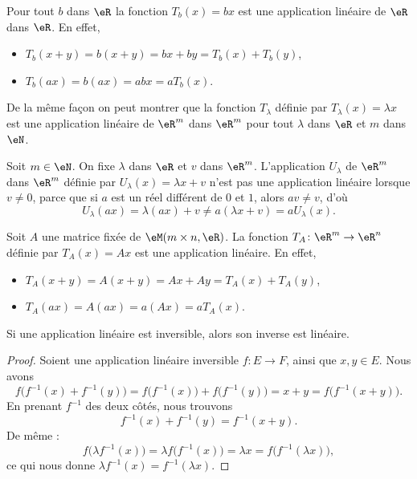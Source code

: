 \begin{example}     \label{EXooMAWMooEaNWpl}
	Pour tout \( b\) dans \( \eR\) la fonction \( T_b(x)= bx\) est une application linéaire de \( \eR\) dans \( \eR\). En effet,
	\begin{itemize}
		\item  \( T_b(x+y)= b(x+y)= bx + by = T_b(x)+T_b(y)\),
		\item \( T_b(ax)=b(ax)= abx = a T_b(x)\).
	\end{itemize}
	De la même façon on peut montrer que la fonction \( T_{\lambda}\) définie par \( T_{\lambda}(x)=\lambda x\) est une application linéaire de \( \eR^m\) dans \( \eR^m\) pour tout \( \lambda\) dans \( \eR\) et \( m\) dans \( \eN\).
\end{example}

\begin{example}     \label{ex_affine}
	Soit \( m\in\eN\). On fixe \( \lambda\) dans \( \eR\) et \( v\) dans \( \eR^m\). L'application \( U_{\lambda}\) de \( \eR^m\) dans \( \eR^m\) définie par \( U_{\lambda}(x)=\lambda x+v\) n'est pas une application linéaire lorsque \( v \neq 0 \), parce que si \( a \) est un réel différent de \(0 \) et \( 1 \), alors \( av \neq v \), d'où
	\[
		U_{\lambda}(ax)=\lambda(ax)+v\neq a(\lambda x+v) =a U_{\lambda}(x).
	\]
\end{example}

\begin{example}     \label{exampleT_A}
	Soit \( A\) une matrice fixée de \( \eM(m\times n, \eR)\). La fonction \( T_A\colon \eR^m\to \eR^n\) définie par \( T_A(x)=Ax\) est une application linéaire. En effet,
	\begin{itemize}
		\item \( T_A(x+y) = A(x+y)= Ax + Ay = T_A(x)+T_A(y)\),
		\item \( T_A(ax)  = A(ax) = a(Ax)   = a T_A(x)\).
	\end{itemize}
\end{example}

\begin{lemma}       \label{LEMooLGEHooVEEoiU}
	Si une application linéaire est inversible, alors son inverse est linéaire.
\end{lemma}

\begin{proof}
	Soient une application linéaire inversible \( f\colon E\to F\), ainsi que \( x,y\in E\). Nous avons
	\begin{equation}
		f\big( f^{-1}(x)+f^{-1}(y) \big)=f\big( f^{-1}(x) \big)+f\big( f^{-1}(y) \big)=x+y=f\big( f^{-1}(x+y) \big).
	\end{equation}
	En prenant \( f^{-1}\) des deux côtés, nous trouvons
	\begin{equation}
		f^{-1}(x)+f^{-1}(y)=f^{-1}(x+y).
	\end{equation}
	De même :
	\begin{equation}
		f\big( \lambda f^{-1}(x) \big)=\lambda f\big( f^{-1}(x) \big)=\lambda x=f\big( f^{-1}(\lambda x) \big),
	\end{equation}
	ce qui nous donne \( \lambda f^{-1}(x)=f^{-1}(\lambda x)\).
\end{proof}


